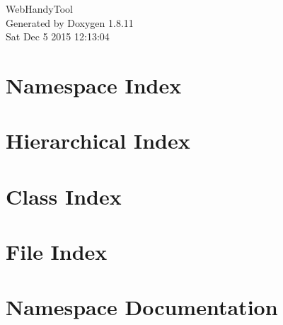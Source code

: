 \documentclass[twoside]{book}
\newcommand{\+}{\discretionary{\mbox{\scriptsize$\hookleftarrow$}}{}{}}
\newcommand{\clearemptydoublepage}{%
  \newpage{\pagestyle{empty}\cleardoublepage}%
}
\begin{document}
\hypersetup{pageanchor=false,
             bookmarks=true,
             bookmarksnumbered=true,
             pdfencoding=unicode
            }
\begin{titlepage}
\vspace*{7cm}
\begin{center}%
{\Large Web\+Handy\+Tool }\\
\vspace*{1cm}
{\large Generated by Doxygen 1.8.11}\\
\vspace*{0.5cm}
{\small Sat Dec 5 2015 12:13:04}\\
\end{center}
\end{titlepage}
\clearemptydoublepage
\tableofcontents
\clearemptydoublepage
{}
\hypersetup{pageanchor=true}

\chapter{Namespace Index}

\chapter{Hierarchical Index}

\chapter{Class Index}

\chapter{File Index}

\chapter{Namespace Documentation}















\end{document}
